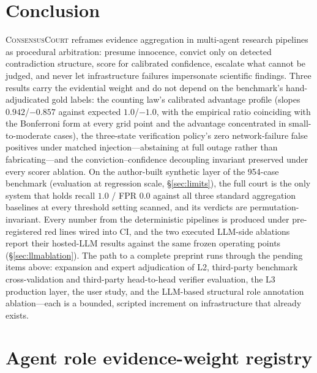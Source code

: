 \documentclass[11pt]{article}
\newcommand{\court}{\textsc{ConsensusCourt}}
\begin{document}
\section{Conclusion}\label{sec:conclusion}

\court{} reframes evidence aggregation in multi-agent research pipelines as
procedural arbitration: presume innocence, convict only on detected
contradiction structure, score for calibrated confidence, escalate what
cannot be judged, and never let infrastructure failures impersonate
scientific findings. Three results carry the evidential weight and do not
depend on the benchmark's hand-adjudicated gold labels: the counting law's
calibrated advantage profile (slopes $0.942$/$-0.857$ against expected
$1.0$/$-1.0$, with the empirical ratio coinciding with the Bonferroni form
at every grid point and the advantage concentrated in small-to-moderate
cases), the three-state verification policy's zero network-failure false
positives under matched injection---abstaining at full outage rather than
fabricating---and the conviction--confidence decoupling invariant preserved
under every scorer ablation. On the author-built synthetic layer of the
954-case benchmark (evaluation at regression scale, \S\ref{sec:limits}),
the full court is the only system that holds recall $1.0$ / FPR $0.0$
against all three standard aggregation baselines at every threshold
setting scanned, and its verdicts are permutation-invariant. Every number
from the deterministic pipelines is produced under pre-registered red
lines wired into CI, and the two executed LLM-side ablations report their
hosted-LLM results against the same frozen operating points
(\S\ref{sec:llmablation}). The path to a complete preprint runs through the
pending items above: expansion and expert adjudication of L2, third-party
benchmark cross-validation and third-party head-to-head verifier
evaluation, the L3 production layer, the user study, and the LLM-based
structural role annotation ablation—each is a bounded, scripted increment
on infrastructure that already exists.




\appendix

\section{Agent role evidence-weight registry}\label{app:roles}
\end{document}
